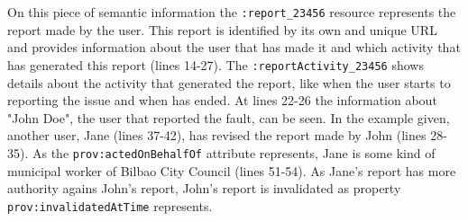 On this piece of semantic information the \texttt{:report\_23456} resource represents the report made by the user. This report is identified by its own and unique URL and provides information about the user that has made it and which activity that has generated this report (lines 14-27). The \texttt{:reportActivity\_23456} shows details about the activity that generated the report, like when the user starts to reporting the issue and when has ended. At lines 22-26 the information about "John Doe", the user that reported the fault, can be seen. In the example given, another user, Jane (lines 37-42), has revised the report made by John (lines 28-35). As the \texttt{prov:actedOnBehalfOf} attribute represents, Jane is some kind of municipal worker of Bilbao City Council (lines 51-54). As Jane's report has more authority agains John's report, John's report is invalidated as property \texttt{prov:invalidatedAtTime} represents.
